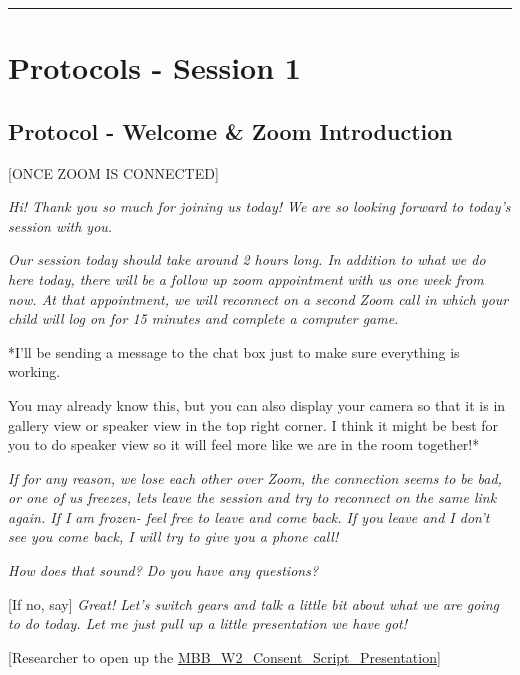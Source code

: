 \documentclass[]{book}
\begin{document}
\begin{center}\rule{0.5\linewidth}{0.5pt}\end{center}

\hypertarget{protocols---session-1-2}{%
\section{Protocols - Session 1}\label{protocols---session-1-2}}

\hypertarget{protocol---welcome-zoom-introduction-2}{%
\subsection{Protocol - Welcome \& Zoom Introduction}\label{protocol---welcome-zoom-introduction-2}}

{[}ONCE ZOOM IS CONNECTED{]}

\emph{Hi! Thank you so much for joining us today! We are so looking forward to today's session with you. }

\emph{Our session today should take around 2 hours long. In addition to what we do here today, there will be a follow up zoom appointment with us one week from now. At that appointment, we will reconnect on a second Zoom call in which your child will log on for 15 minutes and complete a computer game.}

*I'll be sending a message to the chat box just to make sure everything is working.

You may already know this, but you can also display your camera so that it is in gallery view or speaker view in the top right corner. I think it might be best for you to do speaker view so it will feel more like we are in the room together!*

\emph{If for any reason, we lose each other over Zoom, the connection seems to be bad, or one of us freezes, lets leave the session and try to reconnect on the same link again. If I am frozen- feel free to leave and come back. If you leave and I don't see you come back, I will try to give you a phone call!}

\emph{How does that sound? Do you have any questions?}

{[}If no, say{]} \emph{Great! Let's switch gears and talk a little bit about what we are going to do today. Let me just pull up a little presentation we have got!}

{[}Researcher to open up the \href{https://ucla.box.com/s/i1kgjgfa81kbc1c79x67h2tfo0fo2x36}{MBB\_W2\_Consent\_Script\_Presentation}{]}
\end{document}
